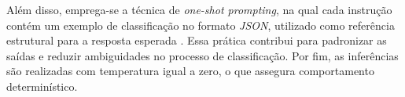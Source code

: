 \documentclass[12pt]{article}
\begin{document}

\begin{table}[!htb]
\centering
\caption{Exemplos de notícias e polaridade por domínio de investimento}
\label{tab:exemplos-noticias}
\end{table}

Além disso, emprega-se a técnica de \textit{one-shot prompting}, na qual cada instrução contém um exemplo de classificação no formato \textit{JSON}, utilizado como referência estrutural para a resposta esperada \cite{boonstra2024prompt}. Essa prática contribui para padronizar as saídas e reduzir ambiguidades no processo de classificação. Por fim, as inferências são realizadas com temperatura igual a zero, o que assegura comportamento determinístico.
\end{document}
